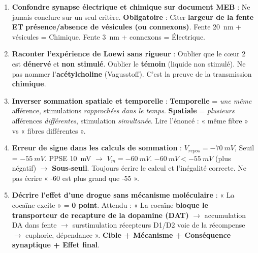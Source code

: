 \documentclass[11pt]{article}
\begin{document}
\begin{attention}
\begin{enumerate}
\item \textbf{Confondre synapse électrique et chimique sur document MEB} : Ne jamais conclure sur un seul critère. \textbf{Obligatoire} : Citer \textbf{largeur de la fente} \textbf{ET} \textbf{présence/absence de vésicules (ou connexons)}. Fente \SI{20}{nm} + vésicules = Chimique. Fente \SI{3}{nm} + connexons = Électrique.
\item \textbf{Raconter l'expérience de Loewi sans rigueur} : Oublier que le cœur 2 est \textbf{dénervé} et \textbf{non stimulé}. Oublier le \textbf{témoin} (liquide non stimulé). Ne pas nommer l'\textbf{acétylcholine} (Vagusstoff). C'est la preuve de la transmission \textbf{chimique}.
\item \textbf{Inverser sommation spatiale et temporelle} : \textbf{Temporelle} = \emph{une même} afférence, stimulations \emph{rapprochées dans le temps}. \textbf{Spatiale} = \emph{plusieurs} afférences \emph{différentes}, stimulation \emph{simultanée}. Lire l'énoncé : « même fibre » vs « fibres différentes ».
\item \textbf{Erreur de signe dans les calculs de sommation} : $V_{repos} = \SI{-70}{mV}$, Seuil = $\SI{-55}{mV}$. PPSE \SI{+10}{mV} $\rightarrow$ $V_m = \SI{-60}{mV}$. \textbf{$\SI{-60}{mV} < \SI{-55}{mV}$} (plus négatif) $\rightarrow$ \textbf{Sous-seuil}. Toujours écrire le calcul et l'inégalité correcte. Ne pas écrire « -60 est plus grand que -55 ».
\item \textbf{Décrire l'effet d'une drogue sans mécanisme moléculaire} : « La cocaïne excite » = \textbf{0 point}. Attendu : « La cocaïne \textbf{bloque le transporteur de recapture de la dopamine (DAT)} $\rightarrow$ accumulation DA dans fente $\rightarrow$ surstimulation récepteurs D1/D2 voie de la récompense $\rightarrow$ euphorie, dépendance ». \textbf{Cible + Mécanisme + Conséquence synaptique + Effet final}.
\end{enumerate}
\end{attention}
\end{document}
